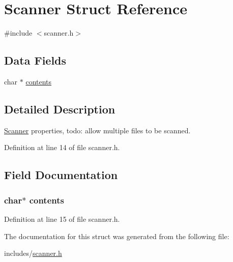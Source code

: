 \hypertarget{struct_scanner}{\section{Scanner Struct Reference}
\label{struct_scanner}
}


{\ttfamily \#include $<$scanner.\+h$>$}

\subsection*{Data Fields}
\begin{DoxyCompactItemize}
\item 
char $\ast$ \hyperlink{struct_scanner_a90428ca35ed3324ed2b73fb28ac4708a}{contents}
\end{DoxyCompactItemize}


\subsection{Detailed Description}
\hyperlink{struct_scanner}{Scanner} properties, todo\+: allow multiple files to be scanned. 

Definition at line 14 of file scanner.\+h.



\subsection{Field Documentation}
\hypertarget{struct_scanner_a90428ca35ed3324ed2b73fb28ac4708a}{
\subsubsection[{contents}]{\setlength{\rightskip}{0pt plus 5cm}char$\ast$ contents}}\label{struct_scanner_a90428ca35ed3324ed2b73fb28ac4708a}


Definition at line 15 of file scanner.\+h.



The documentation for this struct was generated from the following file\+:\begin{DoxyCompactItemize}
\item 
includes/\hyperlink{scanner_8h}{scanner.\+h}\end{DoxyCompactItemize}
